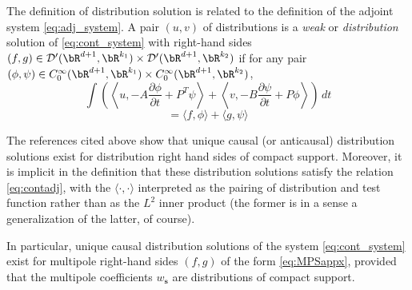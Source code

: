 The definition of distribution solution is related to the definition
of the adjoint system \ref{eq:adj_system}. A pair $(u,v)$ of
distributions is a {\em weak} or {\em distribution} solution of
\ref{eq:cont_system} with right-hand sides $(f,g) \in \mathcal
D'(\bR^{d+1},\bR^{k_1}) \times \mathcal D'(\bR^{d+1},\bR^{k_2})$ if for any pair $(\phi,\psi) \in
C_0^{\infty}(\bR^{d+1},\bR^{k_1}) \times C_0^{\infty}(\bR^{d+1},\bR^{k_2})$,
\[
\int \left( \left\langle u, -A\frac{\partial \phi}{\partial 
    t} + P^T \psi\right\rangle + \left\langle v, -B\frac{\partial\psi}{\partial t} + P\phi\right\rangle \right) \, dt
\]
\begin{equation}
\label{eq:defdistsol}
= \langle f,\phi \rangle + \langle g,\psi \rangle
\end{equation}

The references cited above show that unique causal (or anticausal)
distribution solutions exist for distribution right hand sides of
compact support. Moreover, it is implicit in the definition that these
distribution solutions satisfy the relation \ref{eq:contadj}, with the
$\langle \cdot, \cdot \rangle$ interpreted as the pairing of
distribution and test function rather than as the $L^2$ inner product
(the former is in a sense a generalization of the latter, of course).

In particular, unique causal distribution solutions of the system
\ref{eq:cont_system} exist for multipole right-hand sides $(f,g)$ of
the form \ref{eq:MPSappx}, provided that the multipole coefficients
$w_{\mathbf s}$ are distributions of compact support.

